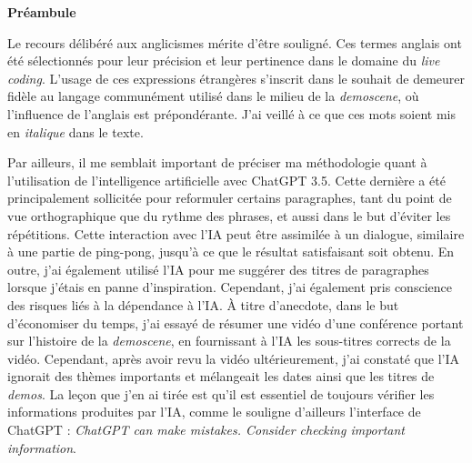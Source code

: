 \begin{titlepage}
    \begin{minipage}[t][\textheight]{\textwidth}
        \vspace*{\fill}
        \begin{flushleft} 
            \Huge\textbf{Préambule}
        \end{flushleft}
        \vspace{1cm}
        \begin{flushleft}

Le recours délibéré aux anglicismes mérite d'être souligné. Ces termes anglais ont été sélectionnés pour leur précision et leur pertinence dans le domaine du \textit{live coding}. L'usage de ces expressions étrangères s'inscrit dans le souhait de demeurer fidèle au langage communément utilisé dans le milieu de la \textit{demoscene}, où l'influence de l'anglais est prépondérante. J'ai veillé à ce que ces mots soient mis en \textit{italique} dans le texte.

Par ailleurs, il me semblait important de préciser ma méthodologie quant à l'utilisation de l'intelligence artificielle avec ChatGPT 3.5. Cette dernière a été principalement sollicitée pour reformuler certains paragraphes, tant du point de vue orthographique que du rythme des phrases, et aussi dans le but d'éviter les répétitions. Cette interaction avec l'IA peut être assimilée à un dialogue, similaire à une partie de ping-pong, jusqu'à ce que le résultat satisfaisant soit obtenu. En outre, j'ai également utilisé l'IA pour me suggérer des titres de paragraphes lorsque j'étais en panne d'inspiration. Cependant, j'ai également pris conscience des risques liés à la dépendance à l'IA. À titre d'anecdote, dans le but d'économiser du temps, j'ai essayé de résumer une vidéo d'une conférence portant sur l'histoire de la \textit{demoscene}, en fournissant à l'IA les sous-titres corrects de la vidéo. Cependant, après avoir revu la vidéo ultérieurement, j'ai constaté que l'IA ignorait des thèmes importants et mélangeait les dates ainsi que les titres de \textit{demos}. La leçon que j'en ai tirée est qu'il est essentiel de toujours vérifier les informations produites par l'IA, comme le souligne d'ailleurs l'interface de ChatGPT : \textit{ChatGPT can make mistakes. Consider checking important information}.
        \end{flushleft}
        \vspace*{\fill}
    \end{minipage}
\end{titlepage}

\cleardoublepage
